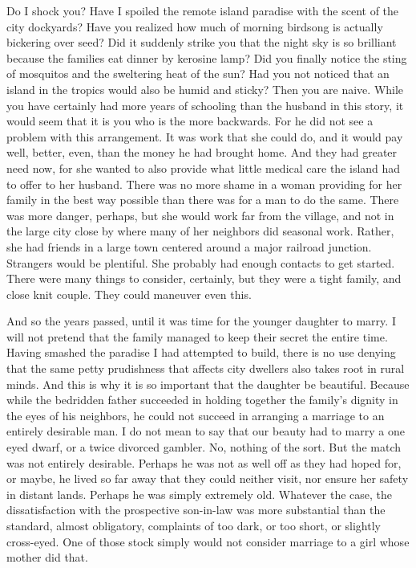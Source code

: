 \documentclass{amsart}
\begin{document}
Do I shock you? Have I spoiled the remote island paradise with the scent of the city dockyards? Have you realized how much of morning birdsong is actually bickering over seed? Did it suddenly strike you that the night sky is so brilliant because the families eat dinner by kerosine lamp? Did you finally notice the sting of mosquitos and the sweltering heat of the sun? Had you not noticed that an island in the tropics would also be humid and sticky? Then you are naive. While you have certainly had more years of schooling than the husband in this story, it would seem that it is you who is the more backwards. For he did not see a problem with this arrangement. It was work that she could do, and it would pay well, better, even, than the money he had brought home. And they had greater need now, for she wanted to also provide what little medical care the island had to offer to her husband. There was no more shame in a woman providing for her family in the best way possible than there was for a man to do the same. There was more danger, perhaps, but she would work far from the village, and not in the large city close by where many of her neighbors did seasonal work. Rather, she had friends in a large town centered around a major railroad junction.  Strangers would be plentiful.  She probably had enough contacts to get started. There were many things to consider, certainly, but they were a tight family, and close knit couple. They could maneuver even this. 

And so the years passed, until it was time for the younger daughter to marry. I will not pretend that the family managed to keep their secret the entire time. Having smashed the paradise I had attempted to build, there is no use denying that the same petty prudishness that affects city dwellers also takes root in rural minds. And this is why it is so important that the daughter be beautiful. Because while the bedridden father succeeded in holding together the family's dignity in the eyes of his neighbors, he could not succeed in arranging a marriage to an entirely desirable man. I do not mean to say that our beauty had to marry a one eyed dwarf, or a twice divorced gambler. No, nothing of the sort. But the match was not entirely desirable. Perhaps he was not as well off as they had hoped for, or maybe, he lived so far away that they could neither visit, nor ensure her safety in distant lands.  Perhaps he was simply extremely old. Whatever the case, the dissatisfaction with the prospective son-in-law was more substantial than the standard, almost obligatory, complaints of too dark, or too short, or slightly cross-eyed. One of those stock simply would not consider marriage to a girl whose mother did that.
\end{document}
